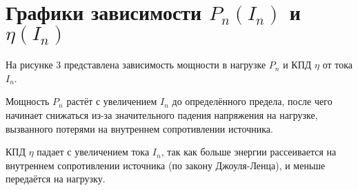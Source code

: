 \section{Графики зависимости $P_n(I_n)$ и $\eta(I_n)$}

На рисунке 3 представлена зависимость мощности в нагрузке \( P_n \) и КПД \( \eta \) от тока \( I_n \).

Мощность $P_n$ растёт с увеличением $I_n$ до определённого предела, после чего начинает снижаться из-за значительного падения напряжения на нагрузке, вызванного потерями на внутреннем сопротивлении источника.

КПД $\eta$ падает с увеличением тока $I_n$, так как больше энергии рассеивается на внутреннем сопротивлении источника (по закону Джоуля-Ленца), и меньше передаётся на нагрузку.


